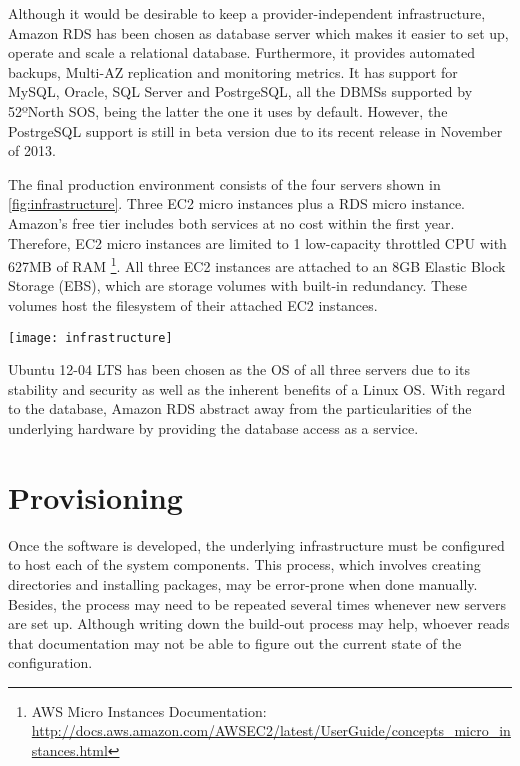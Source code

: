 Although it would be desirable to keep a provider-independent infrastructure, Amazon RDS has been chosen as database server which makes it easier to set up, operate and scale a relational database. Furthermore, it provides automated backups, Multi-AZ replication and monitoring metrics. It has support for MySQL, Oracle, SQL Server and PostrgeSQL, all the DBMSs supported by 52ºNorth SOS, being the latter the one it uses by default. However, the PostrgeSQL support is still in beta version due to its recent release in November of 2013.

The final production environment consists of the four servers shown in \ref{fig:infrastructure}. Three EC2 micro instances plus a RDS micro instance. Amazon's free tier includes both services at no cost within the first year. Therefore, EC2 micro instances are limited to 1 low-capacity throttled CPU with 627MB of RAM \footnote{AWS Micro Instances Documentation: \url{http://docs.aws.amazon.com/AWSEC2/latest/UserGuide/concepts_micro_instances.html}}. All three EC2 instances are attached to an 8GB Elastic Block Storage (EBS), which are storage volumes with built-in redundancy. These volumes host the filesystem of their attached EC2 instances.

\begin{sidewaysfigure}
  \centering
  \texttt{[image: infrastructure]}
  \caption{Production's infrastructure diagram}
  \label{fig:infrastructure}
\end{sidewaysfigure}

Ubuntu 12-04 LTS has been chosen as the OS of all three servers due to its stability and security as well as the inherent benefits of a Linux OS. With regard to the database, Amazon RDS abstract away from the particularities of the underlying hardware by providing the database access as a service.

\section{Provisioning}

Once the software is developed, the underlying infrastructure must be configured to host each of the system components. This process, which involves creating directories and installing packages, may be error-prone when done manually. Besides, the process may need to be repeated several times whenever new servers are set up. Although writing down the build-out process may help, whoever reads that documentation may not be able to figure out the current state of the configuration.

